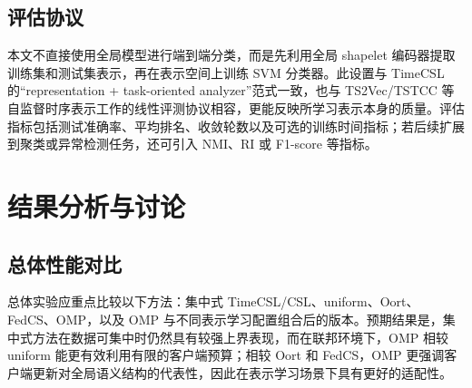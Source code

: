 \documentclass{article}
\begin{document}
\subsection{评估协议}

本文不直接使用全局模型进行端到端分类，而是先利用全局 shapelet 编码器提取训练集和测试集表示，再在表示空间上训练 SVM 分类器。此设置与 TimeCSL 的“representation + task-oriented analyzer”范式一致\cite{timescsl}，也与 TS2Vec/TSTCC 等自监督时序表示工作的线性评测协议相容\cite{ts2vec,tstcc}，更能反映所学习表示本身的质量。评估指标包括测试准确率、平均排名、收敛轮数以及可选的训练时间指标；若后续扩展到聚类或异常检测任务，还可引入 NMI、RI 或 F1-score 等指标。

\section{结果分析与讨论}

\subsection{总体性能对比}

总体实验应重点比较以下方法：集中式 TimeCSL/CSL、uniform、Oort、FedCS、OMP，以及 OMP 与不同表示学习配置组合后的版本。预期结果是，集中式方法在数据可集中时仍然具有较强上界表现，而在联邦环境下，OMP 相较 uniform 能更有效利用有限的客户端预算；相较 Oort 和 FedCS，OMP 更强调客户端更新对全局语义结构的代表性，因此在表示学习场景下具有更好的适配性。
\end{document}

